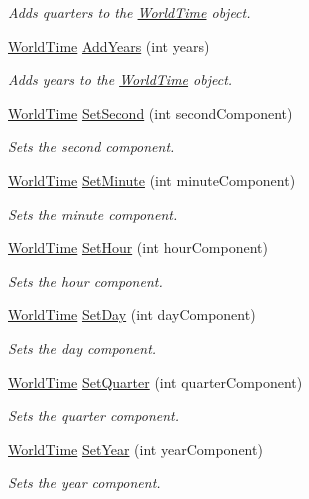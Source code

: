 \begin{DoxyCompactItemize}
\begin{DoxyCompactList}\small\item\em Adds quarters to the \hyperlink{struct_world_time}{World\+Time} object. \end{DoxyCompactList}\item 
\hyperlink{struct_world_time}{World\+Time} \hyperlink{struct_world_time_a31bb7596c5c18af048706dbad01dbc66}{Add\+Years} (int years)
\begin{DoxyCompactList}\small\item\em Adds years to the \hyperlink{struct_world_time}{World\+Time} object. \end{DoxyCompactList}\item 
\hyperlink{struct_world_time}{World\+Time} \hyperlink{struct_world_time_a957c6cddd805cee67195747362f80e31}{Set\+Second} (int second\+Component)
\begin{DoxyCompactList}\small\item\em Sets the second component. \end{DoxyCompactList}\item 
\hyperlink{struct_world_time}{World\+Time} \hyperlink{struct_world_time_aebfbe17309895d4d21abc2e0dd612019}{Set\+Minute} (int minute\+Component)
\begin{DoxyCompactList}\small\item\em Sets the minute component. \end{DoxyCompactList}\item 
\hyperlink{struct_world_time}{World\+Time} \hyperlink{struct_world_time_a069397a3e352a589a89a7c8bca18a66a}{Set\+Hour} (int hour\+Component)
\begin{DoxyCompactList}\small\item\em Sets the hour component. \end{DoxyCompactList}\item 
\hyperlink{struct_world_time}{World\+Time} \hyperlink{struct_world_time_ad0cece460e0ef66a8bbd1de4741d99ec}{Set\+Day} (int day\+Component)
\begin{DoxyCompactList}\small\item\em Sets the day component. \end{DoxyCompactList}\item 
\hyperlink{struct_world_time}{World\+Time} \hyperlink{struct_world_time_a0f9c8d072e53df90474a107674d4973b}{Set\+Quarter} (int quarter\+Component)
\begin{DoxyCompactList}\small\item\em Sets the quarter component. \end{DoxyCompactList}\item 
\hyperlink{struct_world_time}{World\+Time} \hyperlink{struct_world_time_a89f889e3bdaa5915039fb39dd78c211c}{Set\+Year} (int year\+Component)
\begin{DoxyCompactList}\small\item\em Sets the year component. \end{DoxyCompactList}\end{DoxyCompactItemize}
